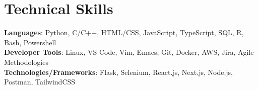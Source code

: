 \documentclass[letterpaper,11pt]{article}
\begin{document}
%
\section{Technical Skills}
 \begin{itemize}[leftmargin=0.15in, label={}]
    \small{\item{
     \textbf{Languages}{: Python, C/C++, HTML/CSS, JavaScript, TypeScript, SQL, R, Bash, Powershell} \\
     \textbf{Developer Tools}{: Linux, VS Code, Vim, Emacs, Git, Docker, AWS, Jira, Agile Methodologies} \\
     \textbf{Technologies/Frameworks}{: Flask, Selenium, React.js, Next.js, Node.js, Postman, TailwindCSS} \\
    }}
 \end{itemize}
 \vspace{-16pt}
\end{document}
